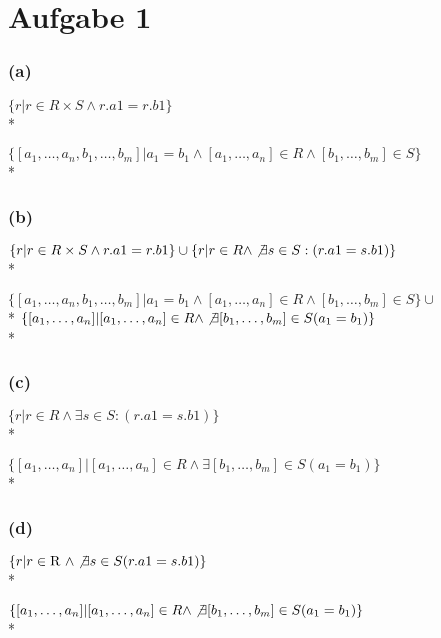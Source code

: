 \documentclass{article}
\begin{document}
\section*{Aufgabe 1}

\subsubsection*{(a)}

$ \{ r | r \in R \times S \land r.a1=r.b1 \} $ \\*

$ \{ [a_1, \ldots, a_n, b_1, \ldots, b_m] | a_1=b_1 \land [a_1, \ldots, a_n] \in R \land [b_1, \ldots, b_m] \in S \} $ \\*

\subsubsection*{(b)}

$ \{ r | r \in R \times S \land r.a1=r.b1 \} \cup \{ r | r \in R \land \not\exists s \in S:(r.a1=s.b1) \} $ \\*

$ \{ [a_1, \ldots, a_n, b_1, \ldots, b_m] | a_1=b_1 \land [a_1, \ldots, a_n] \in R \land [b_1, \ldots, b_m] \in S \} \cup $ \\*
$ \{ [a_1, \ldots, a_n] | [a_1, \ldots, a_n] \in R \land \not\exists [b_1, \ldots, b_m] \in S(a_1=b_1) \} $ \\*

\subsubsection*{(c)}

$ \{ r | r \in R \land \exists s \in S:(r.a1=s.b1) \} $ \\*

$ \{ [a_1, \ldots, a_n] | [a_1, \ldots, a_n] \in R \land \exists [b_1, \ldots, b_m] \in S(a_1=b_1) \} $ \\*

\subsubsection*{(d)}

$ \{ r | r \in \hbox{R } \land \not\exists s \in S(r.a1=s.b1) \} $ \\*

$ \{ [a_1, \ldots, a_n ] | [a_1, \ldots, a_n] \in R \land \not\exists [b_1, \ldots, b_m] \in S(a_1=b_1) \} $ \\*
\end{document}
